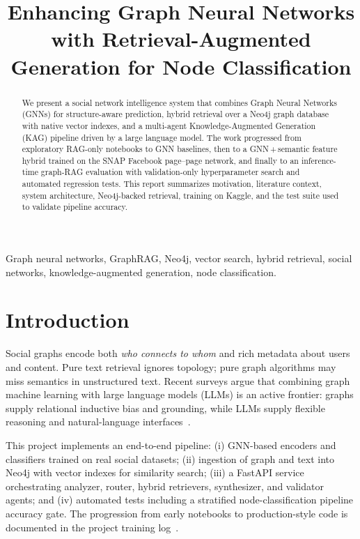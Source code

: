 \documentclass[conference]{IEEEtran}
\title{Enhancing Graph Neural Networks with Retrieval-Augmented Generation for Node Classification}
\author{%
\IEEEauthorblockN{Neeraj Yadav\textsuperscript{*},
Dev Singh\textsuperscript{**},
Gourav Varanasi}%
\IEEEauthorblockA{\textit{Department of Computer Science}\\
\textit{Shiv Nadar University}\\
Greater Noida, India\\
\textsuperscript{*}Student ID: 2310110199 \quad
\textsuperscript{**}Student ID: 2310110099}%
}
\begin{document}
\maketitle

\begin{abstract}
We present a social network intelligence system that combines Graph Neural Networks (GNNs) for structure-aware prediction, hybrid retrieval over a Neo4j graph database with native vector indexes, and a multi-agent Knowledge-Augmented Generation (KAG) pipeline driven by a large language model. The work progressed from exploratory RAG-only notebooks to GNN baselines, then to a GNN\,+\,semantic feature hybrid trained on the SNAP Facebook page--page network, and finally to an inference-time graph-RAG evaluation with validation-only hyperparameter search and automated regression tests. This report summarizes motivation, literature context, system architecture, Neo4j-backed retrieval, training on Kaggle, and the test suite used to validate pipeline accuracy.
\end{abstract}

\begin{IEEEkeywords}
Graph neural networks, GraphRAG, Neo4j, vector search, hybrid retrieval, social networks, knowledge-augmented generation, node classification.
\end{IEEEkeywords}

\section{Introduction}

Social graphs encode both \emph{who connects to whom} and rich metadata about users and content. Pure text retrieval ignores topology; pure graph algorithms may miss semantics in unstructured text. Recent surveys argue that combining graph machine learning with large language models (LLMs) is an active frontier: graphs supply relational inductive bias and grounding, while LLMs supply flexible reasoning and natural-language interfaces~\cite{acm_survey_gml_llm}.

This project implements an end-to-end pipeline: (i) GNN-based encoders and classifiers trained on real social datasets; (ii) ingestion of graph and text into Neo4j with vector indexes for similarity search; (iii) a FastAPI service orchestrating analyzer, router, hybrid retrievers, synthesizer, and validator agents; and (iv) automated tests including a stratified node-classification pipeline accuracy gate. The progression from early notebooks to production-style code is documented in the project training log~\cite{project_doc_internal}.
\end{document}
